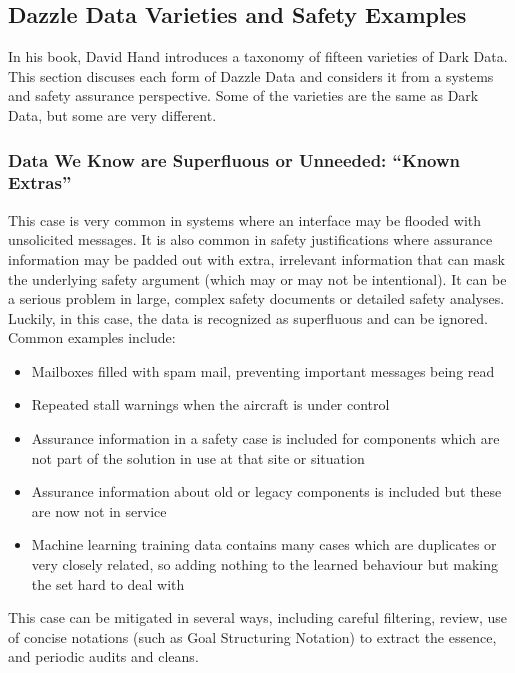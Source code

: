 \subsection{Dazzle Data Varieties and Safety Examples}
In his book, David Hand introduces a taxonomy of fifteen varieties of Dark Data. This section discuses each form of Dazzle Data and considers it from a systems and safety assurance perspective.
Some of the varieties are the same as Dark Data, but some are very different.

\subsubsection{Data We Know are Superfluous or Unneeded: ``Known Extras''}
\label{bkm:dazzledata:case1}

This case is very common in systems where an interface may be flooded with unsolicited messages.
It is also common in  safety justifications where assurance information may be padded out with extra, irrelevant information that can mask the underlying safety argument (which may or may not be intentional).
It can be a serious problem in large, complex safety documents or detailed safety analyses.
Luckily, in this case, the data is recognized as superfluous and can be ignored.
Common examples include:
\begin{itemize}
    \item Mailboxes filled with spam mail, preventing important messages being read
    \item Repeated stall warnings when the aircraft is under control
    \item Assurance information in a safety case is included for components which are not part of the solution in use at that site or situation
    \item Assurance information about old or legacy components is included but these are now not in service
    \item Machine learning training data contains many cases which are duplicates or very closely related, so adding nothing to the learned behaviour but making the set hard to deal with
\end{itemize}
This case can be mitigated in several ways, including careful filtering, review, use of concise  notations (such as Goal Structuring Notation) to extract the essence, and periodic audits and cleans. 

